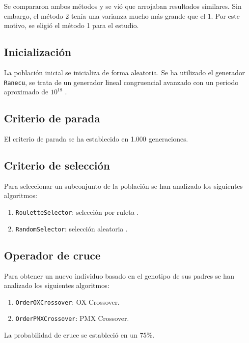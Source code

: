 \documentclass[a4paper,12pt,titlepage]{article}
\begin{document}
Se compararon ambos métodos y se vió que arrojaban resultados similares. Sin embargo, el método 2 tenía una varianza mucho más grande que el 1. Por este motivo, se eligió el método 1 para el estudio.

\subsection{Inicialización}

La población inicial se inicializa de forma aleatoria. Se ha utilizado el generador \lstinline|Ranecu|, se trata de un generador lineal congruencial avanzado con un periodo aproximado de $10^18$ \citep{jclec:ranecu}.

\subsection{Criterio de parada}

El criterio de parada se ha establecido en 1.000 generaciones.

\subsection{Criterio de selección}

Para seleccionar un subconjunto de la población se han analizado los siguientes algoritmos:

\begin{enumerate}[noitemsep]
	\item \lstinline|RouletteSelector|: selección por ruleta \citep{jclec:roulette}.
	\item \lstinline|RandomSelector|: selección aleatoria \citep{jclec:random}.
\end{enumerate}

\subsection{Operador de cruce}

Para obtener un nuevo individuo basado en el genotipo de sus padres se han analizado los siguientes algoritmos:

\begin{enumerate}[noitemsep]
	\item \lstinline|OrderOXCrossover|: OX Crossover. 
	\item \lstinline|OrderPMXCrossover|: PMX Crossover.
\end{enumerate}

La probabilidad de cruce se estableció en un 75\%.
\end{document}
